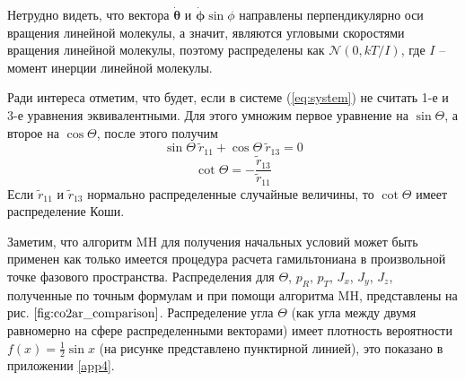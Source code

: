 Нетрудно видеть, что вектора $\dot{\boldsymbol{\theta}}$ и $\dot{\boldsymbol{\phi}} \sin \phi$ направлены перпендикулярно оси вращения линейной молекулы, а значит, являются угловыми скоростями вращения линейной молекулы, поэтому распределены как $\mathcal{N}(0,kT/I)$, где $I$ -- момент инерции линейной молекулы. \par
Ради интереса отметим, что будет, если в системе (\ref{eq:system}) не считать 1-е и 3-е уравнения эквивалентными. Для этого умножим первое уравнение на $\sin\Theta$, а второе на $\cos\Theta$, после этого получим
\[
\sin\Theta \: \tilde{r}_{11} + \cos\Theta \: \tilde{r}_{13} = 0
\]
\[
\cot\Theta = -\frac{\tilde{r}_{13}}{\tilde{r}_{11}}
\]
Если $\tilde{r}_{11}$ и $\tilde{r}_{13}$ нормально распределенные случайные величины, то $\cot\Theta$ имеет распределение Коши. \par
Заметим, что алгоритм MH для получения начальных условий может быть применен как только имеется процедура расчета гамильтониана в произвольной точке фазового пространства. Распределения для $\Theta$, $p_R$, $p_T$, $J_x$, $J_y$, $J_z$, полученные по точным формулам и при помощи алгоритма MH, представлены на рис. $\ref{fig:co2ar_comparison}$. Распределение угла $\Theta$ (как угла между двумя равномерно на сфере распределенными векторами) имеет плотность вероятности $f(x) = \displaystyle \frac{1}{2} \sin x$ (на рисунке представлено пунктирной линией), это показано в приложении \ref{app4}.



